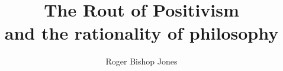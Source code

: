 \usepackage[utf8]{inputenc}
\usepackage[T1]{fontenc}
\usepackage{textcomp}
\renewcommand{\rmdefault}{ppl}
\linespread{1.04}

\makeatletter
\def\cleardoublepage{\clearpage\if@twoside \ifodd\c@page\else
\hbox{}
\vspace*{\fill}
\begin{center}
\end{center}
\vspace{\fill}
\thispagestyle{empty}
\newpage
\if@twocolumn\hbox{}\newpage\fi\fi\fi}
\makeatother

\usepackage{fancyhdr}
\pagestyle{fancyplain}

\usepackage[twoside,paperwidth=5in,paperheight=8in,hmargin={0.75in,0.5in},vmargin={0.5in,0.5in},includehead,includefoot]{geometry}
\usepackage{tocloft}
\usepackage{tocbibind}
\makeindex
\newcommand{\indexentry}[2]{\item #1 #2}
\newcommand{\ignore}[1]{}

\fancyhfoffset[EL,RO]{0pt}
\newcommand{\aref}{}
\newcommand{\bookname}{}
\renewcommand{\chaptermark}[1]{\markboth{#1}{}}
\renewcommand{\sectionmark}[1]{\markright{#1}}
\lhead[\fancyplain{}{\thepage}]         {\fancyplain{}{}}
\chead[\fancyplain{}{\slshape\leftmark}]                 {\fancyplain{}{\slshape\rightmark}}
\rhead[\fancyplain{}{}]       {\fancyplain{}{\thepage}}
\lfoot[\fancyplain{}{\aref}]            {\fancyplain{}{}}
\cfoot[\fancyplain{}{}]                 {\fancyplain{}{}}
\rfoot[\fancyplain{}{}]                 {\fancyplain{}{\aref}}

\renewcommand{\headrulewidth}{0pt}

\title{The Rout of Positivism \\ {\large and the rationality of philosophy}}
\author{Roger Bishop Jones}
\date{\ }


\frontmatter

